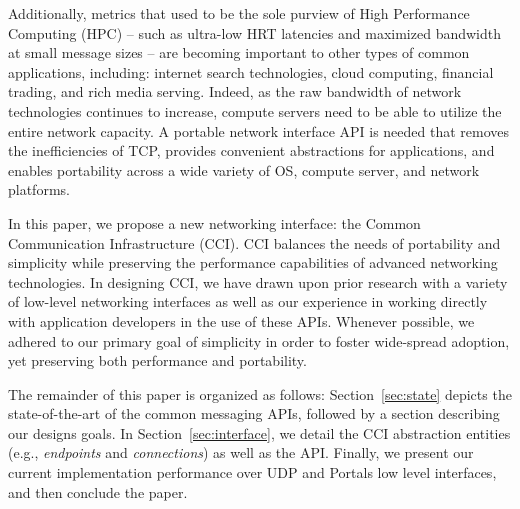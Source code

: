 Additionally, metrics that used to be the sole purview of High
Performance Computing (HPC) -- such as ultra-low HRT latencies and
maximized bandwidth at small message sizes -- are becoming important
to other types of common applications, including: internet search
technologies, cloud computing, financial trading, and rich media
serving.
%
Indeed, as the raw bandwidth of network technologies continues to
increase, compute servers need to be able to utilize the entire
network capacity.
%
A portable network interface API is needed that removes the
inefficiencies of TCP, provides convenient abstractions for
applications, and enables portability across a wide variety of OS,
compute server, and network platforms.

In this paper, we propose a new networking interface: the Common
Communication Infrastructure (CCI).  
%
CCI balances the needs of portability and simplicity while preserving
the performance capabilities of advanced networking technologies. 
%
In designing CCI, we have drawn upon prior research with a variety of
low-level networking interfaces as well as our experience in working
directly with application developers in the use of these APIs.
%
Whenever possible, we adhered to our primary goal of simplicity in
order to foster wide-spread adoption, yet preserving both performance
and portability.

The remainder of this paper is organized as follows:
%
Section~\ref{sec:state} depicts the state-of-the-art of the common
messaging APIs, followed by a section describing our designs goals.
%
In Section~\ref{sec:interface}, we detail the CCI abstraction entities
(e.g., {\em endpoints} and {\em connections}) as well as the API.
%
Finally, we present our current implementation performance over UDP
and Portals low level interfaces, and then conclude the paper.



